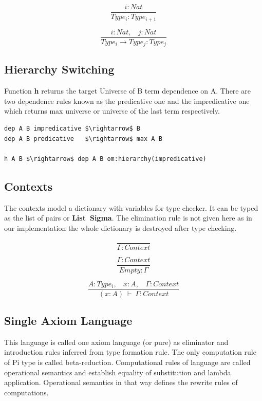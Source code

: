 \documentclass{aip-cp}
\begin{document}
\begin{equation}
\tag{$A_2$}
\dfrac
{i: Nat}
{Type_i : Type_{i+1}}
\end{equation}

\begin{equation}
\tag{$R_2$}
\dfrac
{i : Nat,\ \ \ \ j : Nat}
{Type_i \rightarrow Type_{j} : Type_{j}}
\end{equation}

\subsection{Hierarchy Switching}
Function {\bf h} returns the target Universe of B term dependence on A.
There are two dependence rules known as the predicative one and the
impredicative one which returns max universe or universe of the last term respectively.

\begin{lstlisting}[mathescape=true]
dep A B impredicative $\rightarrow$ B
dep A B predicative   $\rightarrow$ max A B

h A B $\rightarrow$ dep A B om:hierarchy(impredicative)
\end{lstlisting}

\subsection{Contexts}

The contexts model a dictionary with variables for type checker.
It can be typed as the list of pairs or {\bf List\ Sigma}. The elimination
rule is not given here as in our implementation the whole dictionary
is destroyed after type checking.

\begin{equation}
\tag{Ctx-formation}
\dfrac
{}
{\Gamma : Context}
\end{equation}

\begin{equation}
\tag{Ctx-intro$_1$}
\dfrac
{\Gamma : Context}
{Empty : \Gamma}
\end{equation}

\begin{equation}
\tag{Ctx-intro$_2$}
\dfrac
{A : Type_i,\ \ \ \ x : A,\ \ \ \ \Gamma : Context}
{(x : A)\ \vdash\ \Gamma : Context}
\end{equation}

\subsection{Single Axiom Language}
This language is called one axiom language (or pure) as eliminator
and introduction rules inferred from type formation rule.
The only computation rule of Pi type is called beta-reduction.
Computational rules of language are called operational semantics
and establish equality of substitution and lambda application.
Operational semantics in that way defines the rewrite rules of computations.
\end{document}
